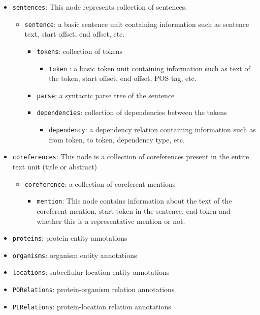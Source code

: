 \begin{enumerate}
\begin{itemize}
\item \texttt{sentences}: This node represents collection of sentences.
  \begin{itemize}
  \item \texttt{sentence}: a basic sentence unit containing information such as sentence text, start offset, end offset, etc.
    \begin{itemize}
	\item \texttt{tokens}: collection of tokens
	  \begin{itemize}
	  \item \texttt{token}	: a basic token unit containing information such as text of the token, start offset, end offset, POS tag, etc.
	  \end{itemize}
	\item \texttt{parse}: a syntactic parse tree of the sentence
	\item \texttt{dependencies}: collection of dependencies between the tokens
	  \begin{itemize}
	  \item \texttt{dependency}: a dependency relation containing information such as from token, to token, dependency type, etc.
	  \end{itemize}
	\end{itemize}
  \end{itemize}
  \item \texttt{coreferences}:
    This node is a collection of coreferences present in the entire text unit (title or abstract)
    \begin{itemize}
    \item \texttt{coreference}: a collection of coreferent mentions
    \begin{itemize}
      \item \texttt{mention}: This node contains information about the text of the coreferent mention, start token in the sentence, end token and whether this is a representative mention or not.
    \end{itemize}
    \end{itemize}

\item \texttt{proteins}: protein entity annotations
\item \texttt{organisms}: organism entity annotations
\item \texttt{locations}: subcellular location entity annotations
\item \texttt{PORelations}: protein-organism relation annotations
\item \texttt{PLRelations}: protein-location relation annotations
\end{itemize}


\end{enumerate}

